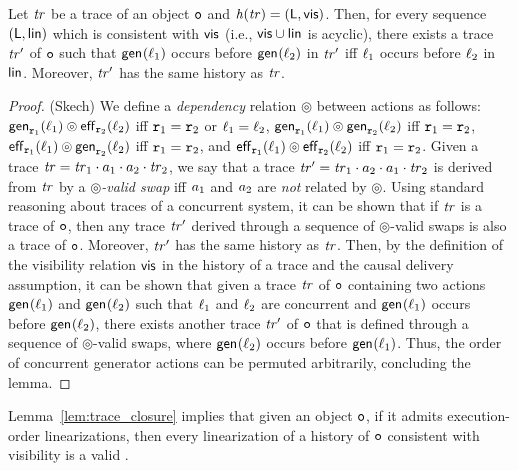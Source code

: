 \begin{lemma}\label{lem:trace_closure}
Let $\mathit{tr}$ be a trace of an object $\mathtt{o}$ and $\mathit{h}({\mathit{tr})}=(\mathsf{L},\mathsf{vis})$. Then, for every sequence $(\mathsf{L},\mathsf{lin})$ which is consistent with $\mathsf{vis}$ (i.e., $\mathsf{vis}
    \cup \mathsf{lin}$ is acyclic), there exists a trace $\mathit{tr}'$ of $\mathtt{o}$ such that $\mathsf{gen}_{}(\ell_1)$ occurs before $\mathsf{gen}_{}(\ell_2)$ in $\mathit{tr}'$ iff $\ell_1$ occurs before $\ell_2$ in $\mathsf{lin}$. Moreover, $\mathit{tr}'$ has the same history as $\mathit{tr}$.
\end{lemma}
\vspace{-10pt}
\begin{proof}(Skech)
We define a \emph{dependency} relation $\circledcirc$ between actions as follows: $\mathsf{gen}_{\mathtt{r}_1}(\ell_1)\circledcirc \mathsf{eff}_{\mathtt{r}_2}(\ell_2)$ iff $\mathtt{r}_1=\mathtt{r}_2$ or $\ell_1=\ell_2$, $\mathsf{gen}_{\mathtt{r}_1}(\ell_1)\circledcirc \mathsf{gen}_{\mathtt{r}_2}(\ell_2)$ iff $\mathtt{r}_1=\mathtt{r}_2$, $\mathsf{eff}_{\mathtt{r}_1}(\ell_1)\circledcirc \mathsf{gen}_{\mathtt{r}_2}(\ell_2)$ iff $\mathtt{r}_1=\mathtt{r}_2$, and $\mathsf{eff}_{\mathtt{r}_1}(\ell_1)\circledcirc \mathsf{eff}_{\mathtt{r}_2}(\ell_2)$ iff $\mathtt{r}_1=\mathtt{r}_2$. Given a trace $\mathit{tr}=\mathit{tr}_1\cdot a_1\cdot a_2\cdot\mathit{tr}_2$, we say that a trace $\mathit{tr}'=\mathit{tr}_1\cdot a_2\cdot a_1\cdot\mathit{tr}_2$ is derived from $\mathit{tr}$ by a \emph{$\circledcirc$-valid swap} iff $a_1$ and $a_2$ are \emph{not} related by $\circledcirc$. Using standard reasoning about traces of a concurrent system, it can be shown that if $\mathit{tr}$ is a trace of $\mathtt{o}$, then any trace $\mathit{tr}'$ derived through a sequence of $\circledcirc$-valid swaps is also a trace of $\mathtt{o}$. Moreover, $\mathit{tr}'$ has the same history as $\mathit{tr}$. Then, by the definition of the visibility relation $\mathsf{vis}$ in the history of a trace and the causal delivery assumption, it can be shown that given a trace $\mathit{tr}$ of $\mathtt{o}$ containing two actions $\mathsf{gen}_{}(\ell_1)$ and $\mathsf{gen}_{}(\ell_2)$ such that $\ell_1$ and $\ell_2$ are concurrent and $\mathsf{gen}_{}(\ell_1)$ occurs before $\mathsf{gen}_{}(\ell_2)$, there exists another trace $\mathit{tr}'$ of $\mathtt{o}$ that is defined through a sequence of $\circledcirc$-valid swaps, where $\mathsf{gen}_{}(\ell_2)$ occurs before $\mathsf{gen}_{}(\ell_1)$. Thus, the order of concurrent generator actions can be permuted arbitrarily, concluding the lemma.
\end{proof}

Lemma~\ref{lem:trace_closure} implies that given an \crdtlinearizable{} object $\mathtt{o}$, if it admits execution-order linearizations, then every linearization of a history of $\mathtt{o}$ consistent with visibility is a valid \crdtlinearization{}.


